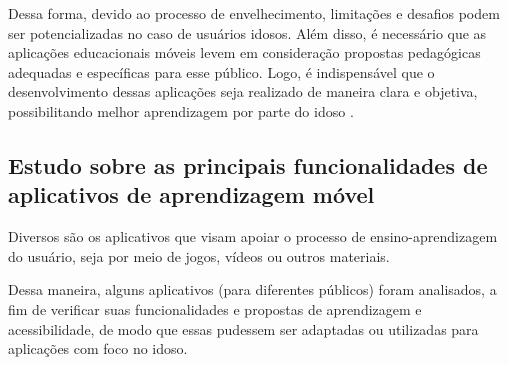 Dessa forma, devido ao processo de envelhecimento, limitações e desafios podem ser potencializadas no caso de usuários idosos. Além disso, é necessário que as aplicações educacionais móveis levem em consideração propostas pedagógicas adequadas e específicas para esse público. Logo, é indispensável que o desenvolvimento dessas aplicações seja realizado de maneira clara e objetiva, possibilitando melhor aprendizagem por parte do idoso \citep{giubilei1993pedagogia}.

\subsection{Estudo sobre as principais funcionalidades de aplicativos de aprendizagem móvel}

Diversos são os aplicativos que visam apoiar o processo de ensino-aprendizagem do usuário, seja por meio de jogos, vídeos ou outros materiais. 

Dessa maneira, alguns aplicativos (para diferentes públicos) foram analisados, a fim de verificar suas funcionalidades e propostas de aprendizagem e acessibilidade, de modo que essas pudessem ser adaptadas ou utilizadas para aplicações com foco no idoso.

